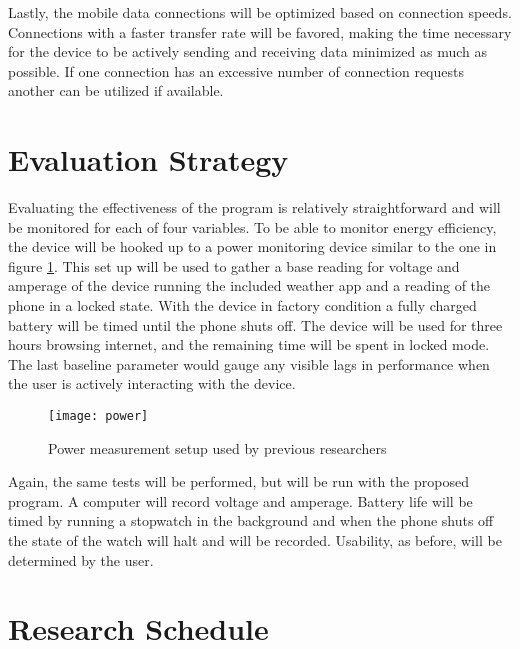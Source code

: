 \documentclass[11pt]{article}
\begin{document}
Lastly, the mobile data connections will be optimized based on connection speeds. Connections with a faster transfer rate will be favored, making the time necessary for the device to be actively sending and receiving data minimized as much as possible. If one connection has an excessive number of connection requests another can be utilized if available.

\vspace*{-.2in}
\section{Evaluation Strategy}
\label{sec:evaluate}
\vspace*{-.1in}

Evaluating the effectiveness of the program is relatively straightforward and will be monitored for each of four variables. To be able to monitor energy efficiency, the device will be hooked up to a power monitoring device similar to the one in figure \ref{fig:power}. This set up will be used to gather a base reading for voltage and amperage of the device running the included weather app and a reading of the phone in a locked state. With the device in factory condition a fully charged battery will be timed until the phone shuts off. The device will be used for three hours browsing internet, and the remaining time will be spent in locked mode. The last baseline parameter would gauge any visible lags in performance when the user is actively interacting with the device.

\begin{figure}
\begin{center}
\texttt{[image: power]}
\caption{\label{fig:power} Power measurement setup used by previous researchers \cite{Fei:2008:EFD:1347375.1347380}}
\end{center}
\end{figure}

Again, the same tests will be performed, but will be run with the proposed program. A computer will record voltage and amperage. Battery life will be timed by running a stopwatch in the background and when the phone shuts off the state of the watch will halt and will be recorded. Usability, as before, will be determined by the user.

\vspace*{-.1in}
\section{Research Schedule}
\label{sec:schedule}
\vspace*{-.1in}
\end{document}
